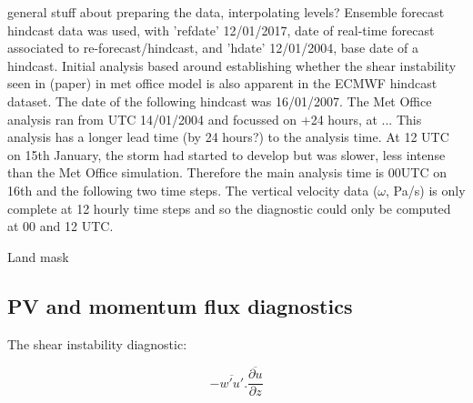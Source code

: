 %
%
%
%

 general stuff about preparing the data, interpolating levels?
Ensemble forecast hindcast data was used, with 'refdate' 12/01/2017, date of real-time forecast associated to re-forecast/hindcast, and 'hdate' 12/01/2004, base date of a hindcast. Initial analysis based around establishing whether the shear instability seen in (paper) in met office model is also apparent in the ECMWF hindcast dataset. 
The date of the following hindcast was 16/01/2007. The Met Office analysis ran from UTC 14/01/2004 and focussed on +24 hours, at ...
This analysis has a longer lead time (by 24 hours?) to the analysis time. At 12 UTC on 15th January, the storm had started to develop but was slower, less intense than the Met Office simulation. Therefore the main analysis time is 00UTC on 16th and the following two time steps.
The vertical velocity data ($\omega$, Pa/s) is only complete at 12 hourly time steps and so the diagnostic could only be computed at 00 and 12 UTC.


Land mask

\subsection {PV and momentum flux diagnostics}

The shear instability diagnostic:

\begin{equation} \label{eq_diag}
-\overline{w'u'} . \frac{\overline{\partial u}}{\partial z}
\end{equation}


